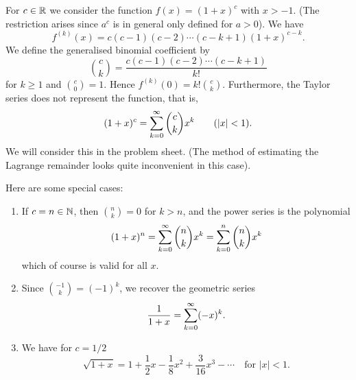 \documentclass[10pt, a4paper]{article}
\newcommand{\infsumo}{\infsum[k = 0]}
\begin{document}
\begin{example}
    For $c \in \mathbb{R}$ we consider the function $f(x) = (1 + x) ^ c$ with $x > -1$.
    (The restriction arises since $a ^ c$ is in general only defined for $a > 0$).
    We have
    \[
    f ^ {(k)}(x) = c(c - 1)(c - 2)\dotsi(c - k + 1)(1 + x) ^ {c - k}.
    \]
    We define the generalised binomial coefficient by
    \[
    \binom{c}{k} = \frac{c(c - 1)(c - 2)\dotsi(c - k + 1)}{k!}
    \]
    for $k \geq 1$ and $\binom{c}{0} = 1$.
    Hence $f ^ {(k)}(0) = k!\binom{c}{k}$.
    Furthermore,
    the Taylor series does not represent the function,
    that is,
    \[
    (1 + x) ^ c = \infsumo\binom{c}{k}x ^ k\qquad(|x| < 1).
    \]
    We will consider this in the problem sheet.
    (The method of estimating the Lagrange remainder looks quite inconvenient in this case).

    Here are some special cases:
    \begin{enumerate}[label = (\roman*)]
        \item If $c = n \in \mathbb{N}$,
        then $\binom{n}{k} = 0$ for $k > n$,
        and the power series is the polynomial
        \[
        (1 + x) ^ n = \infsumo\binom{n}{k}x ^ k = \sum_{k = 0}^{n}\binom{n}{k}x ^ k
        \]
        which of course is valid for all $x$.
        
        \item Since $\binom{-1}{k} = (-1) ^ k$,
        we recover the geometric series
        \[
        \frac{1}{1 + x} = \infsumo(-x) ^ k.
        \]

        \item We have for $c = 1 / 2$
        \[
        \sqrt{1 + x} = 1 + \frac{1}{2}x - \frac{1}{8}x ^ 2 + \frac{3}{16}x ^ 3 - \dotsi\quad\text{for } |x| < 1.
        \]
    \end{enumerate}
\end{example}
\end{document}
